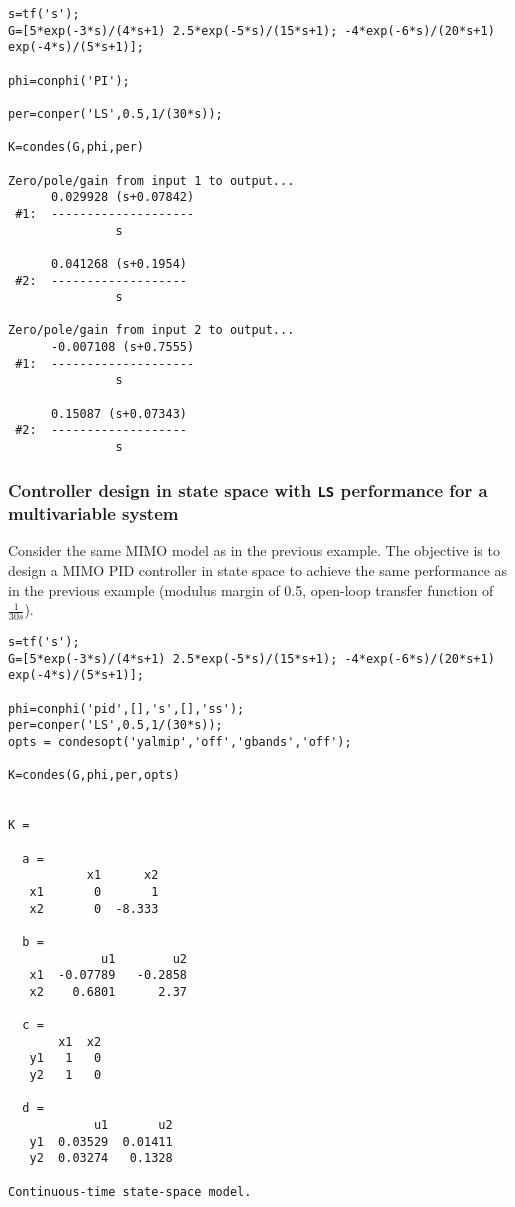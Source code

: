 \documentclass [12pt , a4paper] {report}
\begin{document}
\begin{lstlisting}
s=tf('s');
G=[5*exp(-3*s)/(4*s+1) 2.5*exp(-5*s)/(15*s+1); -4*exp(-6*s)/(20*s+1) exp(-4*s)/(5*s+1)];

phi=conphi('PI'); 

per=conper('LS',0.5,1/(30*s)); 

K=condes(G,phi,per)

Zero/pole/gain from input 1 to output...
      0.029928 (s+0.07842)
 #1:  --------------------
               s
 
      0.041268 (s+0.1954)
 #2:  -------------------
               s
 
Zero/pole/gain from input 2 to output...
      -0.007108 (s+0.7555)
 #1:  --------------------
               s
 
      0.15087 (s+0.07343)
 #2:  -------------------
               s
\end{lstlisting}

\subsubsection{Controller design in state space with {\tt LS} performance for a multivariable system}
Consider the same MIMO model as in the previous example.
The objective is to design a MIMO PID controller in state space to achieve the same performance as in the previous example (modulus margin of 0.5, open-loop transfer function of $\frac{1}{30s}$).

\begin{lstlisting}
s=tf('s');
G=[5*exp(-3*s)/(4*s+1) 2.5*exp(-5*s)/(15*s+1); -4*exp(-6*s)/(20*s+1) exp(-4*s)/(5*s+1)];

phi=conphi('pid',[],'s',[],'ss'); 
per=conper('LS',0.5,1/(30*s)); 
opts = condesopt('yalmip','off','gbands','off');

K=condes(G,phi,per,opts)


K =
 
  a = 
           x1      x2
   x1       0       1
   x2       0  -8.333
 
  b = 
             u1        u2
   x1  -0.07789   -0.2858
   x2    0.6801      2.37
 
  c = 
       x1  x2
   y1   1   0
   y2   1   0
 
  d = 
            u1       u2
   y1  0.03529  0.01411
   y2  0.03274   0.1328
 
Continuous-time state-space model.

\end{lstlisting}
\end{document}
